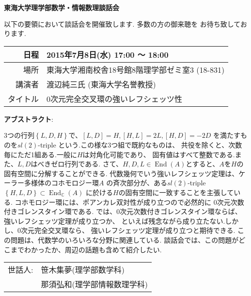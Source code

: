 \documentclass[11pt]{jarticle}
\title{}
\author{}
\date{}
\theoremstyle{definition}
\newcommand{\End}{\operatorname{End}}
\begin{document}

\begin{center}
 {\bf \Huge 東海大学理学部数学・情報数理談話会}
\end{center}

{\Large
以下の要領において談話会を開催致します. 多数の方の御来聴を
お待ち致しております. 

\smallskip

{\bf
\begin{center}
  \begin{tabular}{|r|l|}
    \hline
    日程 & 2015年7月8日(水) 17:00 〜 18:00 \\
    \hline
    場所 & 東海大学湘南校舎18号館8階理学部ゼミ室3 (18-831)\\
    \hline
    講演者 & 渡辺純三氏 (東海大学名誉教授)\\
    \hline
    タイトル & 0次元完全交叉環の強いレフシェッツ性 \\
    \hline
  \end{tabular}
\end{center}
}

\noindent
{\bf アブストラクト}:

3つの行列$\left\{L,D,H\right\}$で、$[L,D] = H,[H,L] = 2L,[H,D] = −2D$
を満たすものを$sl(2)$-triple という.この様な3つ組で既約なものは、
共役を除くと、次数毎にただ1組ある.一般に$H$は対角化可能であり、
固有値はすべて整数である.また、$L,D$はべきゼロ行列である.
さて、$H,D,L \in \End(A)$とすると、$A$を$H$の固有空間に分解することができる.
代数幾何でいう強いレフシェッツ定理は、ケーラー多様体のコホモロジー環$A$
の斉次部分が、ある$sl(2)$-triple 
$\left\{H, L, D\right\} ⊂ \End_{\mathbb C}(A)$
に於ける$H$の固有空間に一致することを主張している.
コホモロジー環には、ポアンカレ双対性が成り立つので必然的に 
0次元次数付きゴレンスタイン環である.
では、0次元次数付きゴレンスタイン環ならば、強いレフシェッツ定理が成り立つか、
といえば残念ながら成り立たない.しかし、0次元完全交叉環なら、
強いレフシェッツ定理が成り立つと期待できる.
この問題は、代数学のいろいろな分野に関連している.
談話会では、この問題がどこまでわかったか、周辺の話題も含めて紹介したい.

\vskip 2cm

\begin{flushright}
  \begin{tabular}{rl}
      世話人: & 笹木集夢(理学部数学科)\\ 
      & 那須弘和(理学部情報数理学科)
  \end{tabular}

\end{flushright}
}
\end{document}
